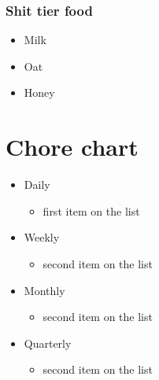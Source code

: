 \documentclass[a4paper]{article}
\begin{document}
\subsubsection{Shit tier food}
		\begin{itemize}
     \item Milk
     \item Oat
     \item Honey
     \end{itemize}
\section{Chore chart}
\begin{itemize}
    \item Daily
    \begin{itemize}
        \item first item on the list
    \end{itemize}
    \item Weekly
    \begin{itemize}
        \item second item on the list
    \end{itemize}
    \item Monthly
    \begin{itemize}
        \item second item on the list
    \end{itemize}
    \item Quarterly
    \begin{itemize}
        \item second item on the list
    \end{itemize}
\end{itemize}
\end{document}
